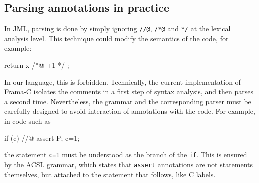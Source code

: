 \subsection{Parsing annotations in practice}

In JML, parsing is done by simply ignoring \verb|//@|, \verb|/*@| and
\verb|*/| at the lexical analysis level. This technique could modify the
semantics of the code, for example:
\begin{listing}{1}
return x /*@ +1 */ ;
\end{listing}
In our language, this is forbidden. Technically, the current
implementation of Frama-C isolates the comments in a first step of
syntax analysis, and then parses a second time. Nevertheless, the
grammar and the corresponding parser must be carefully designed to
avoid interaction of annotations with the code. For example, in code such as
\begin{listing}{1}
  if (c) //@ assert P;
     c=1;
\end{listing}
the statement \lstinline|c=1| must be understood as the
branch of the \texttt{if}. This is ensured by the ACSL grammar,
which states that \lstinline|assert| annotations are not statements themselves,
but attached to the statement that follows, like C labels.
